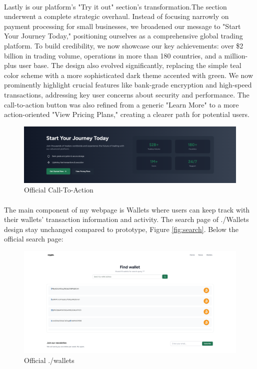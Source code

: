 \paragraph{} Lastly is our platform's "Try it out" section's transformation.The section underwent a complete strategic overhaul. Instead of focusing narrowly on payment processing for small businesses, we broadened our message to "Start Your Journey Today," positioning ourselves as a comprehensive global trading platform. To build credibility, we now showcase our key achievements: over \$2 billion in trading volume, operations in more than 180 countries, and a million-plus user base.
The design also evolved significantly, replacing the simple teal color scheme with a more sophisticated dark theme accented with green. We now prominently highlight crucial features like bank-grade encryption and high-speed transactions, addressing key user concerns about security and performance. The call-to-action button was also refined from a generic "Learn More" to a more action-oriented "View Pricing Plans," creating a clearer path for potential users.
 \begin{figure}[h]
    \centering
    \includegraphics[width= 1\textwidth]{root/cta_2.png}
     \caption{Official Call-To-Action}
    \label{fig:cta_2.0}
\end{figure}
\paragraph{} The main component of my webpage is Wallets where users can keep track with their wallets' transaction information and activity. The search page of ./Wallets design stay unchanged compared to prototype, Figure \ref{fig:search}. Below the official search page:
 \begin{figure}[h]
    \centering
    \includegraphics[width= 1\textwidth]{root/wallet_search.png}
     \caption{Official ./wallets}
    \label{fig:wallet_search}
\end{figure}
